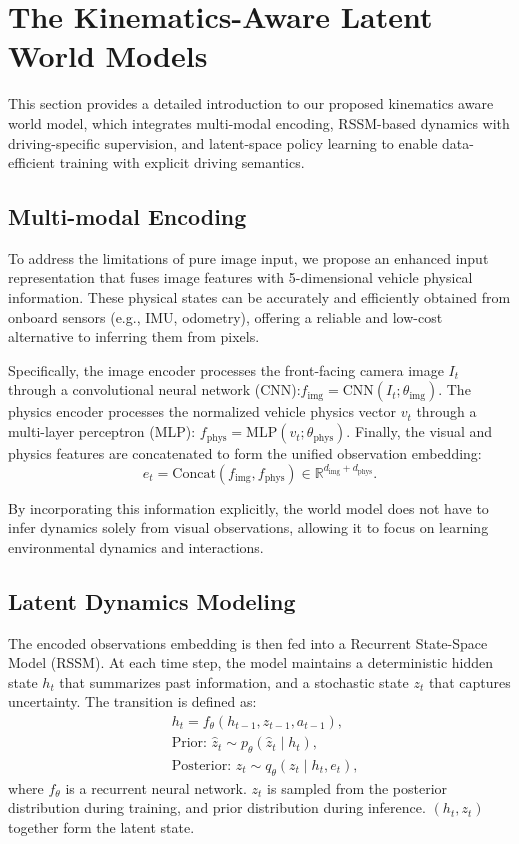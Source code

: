 \section{The Kinematics-Aware Latent World Models}
\label{03_greedy_algorithm}

This section provides a detailed introduction to our proposed kinematics aware world model, which integrates multi-modal encoding, RSSM-based dynamics with driving-specific supervision, and latent-space policy learning to enable data-efficient training with explicit driving semantics.

\subsection{Multi-modal Encoding}
To address the limitations of pure image input, we propose an enhanced input representation that fuses image features with 5-dimensional vehicle physical information. These physical states can be accurately and efficiently obtained from onboard sensors (e.g., IMU, odometry), offering a reliable and low-cost alternative to inferring them from pixels.

Specifically, the image encoder processes the front-facing camera image \( I_t \) through a convolutional neural network (CNN):\( f_{\text{img}} = \text{CNN}(I_t; \theta_{\text{img}}) \). The physics encoder processes the normalized vehicle physics vector \( v_t \) through a multi-layer perceptron (MLP): \( f_{\text{phys}}= \text{MLP}(v_t; \theta_{\text{phys}}) \). Finally, the visual and physics features are concatenated to form the unified observation embedding:
\begin{equation}
e_t = \text{Concat}(f_{\text{img}}, f_{\text{phys}}) \in \mathbb{R}^{d_{\text{img}} + d_{\text{phys}}}.
\end{equation}

By incorporating this information explicitly, the world model does not have to infer dynamics solely from visual observations, allowing it to focus on learning environmental dynamics and interactions.

\subsection{Latent Dynamics Modeling}
The encoded observations embedding is then fed into a Recurrent State-Space Model (RSSM)\cite{hafner2025mastering}. At each time step, the model maintains a deterministic hidden state $h_t$ that summarizes past information, and a stochastic state $z_t$ that captures uncertainty. The transition is defined as:
\begin{equation}
\begin{aligned}
&h_t = f_\theta(h_{t-1}, z_{t-1}, a_{t-1}), \\
&\text{Prior: } \hat{z}_t \sim p_\theta(\hat{z}_t \mid h_t), \\
&\text{Posterior: } z_t \sim q_\theta(z_t \mid h_t, e_t),
\end{aligned}
\end{equation}
where $f_\theta$ is a recurrent neural network. $z_t$ is sampled from the posterior distribution during training, and prior distribution during inference. $(h_{t}, z_{t})$ together form the latent state. 

